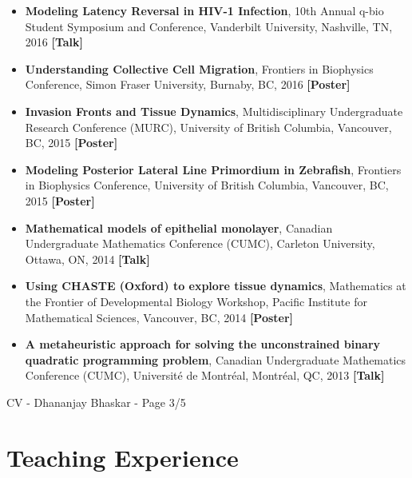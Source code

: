 \documentclass[margin,line]{res}
\begin{document}
\begin{resume}
{\renewcommand\leftmargini{0em}
\begin{itemize}
\item {\bf Modeling Latency Reversal in HIV-1 Infection}, 10th Annual q-bio Student Symposium and Conference, Vanderbilt University, Nashville, TN, 2016 {\bf[Talk]}
\vspace*{.2cm}
\item {\bf Understanding Collective Cell Migration}, Frontiers in Biophysics Conference, Simon Fraser University, Burnaby, BC, 2016 {\bf[Poster]}
\vspace*{.2cm}
\item {\bf Invasion Fronts and Tissue Dynamics}, Multidisciplinary Undergraduate Research Conference (MURC), University of British Columbia, Vancouver, BC, 2015 {\bf[Poster]}
\vspace*{.2cm}
\item {\bf Modeling Posterior Lateral Line Primordium in Zebrafish}, Frontiers in Biophysics Conference, University of British Columbia, Vancouver, BC, 2015 {\bf[Poster]}
\vspace*{.2cm}
\item {\bf Mathematical models of epithelial monolayer}, Canadian Undergraduate Mathematics Conference (CUMC), Carleton University, Ottawa, ON, 2014 {\bf[Talk]}
\vspace*{.2cm}
\item {\bf Using CHASTE (Oxford) to explore tissue dynamics}, Mathematics at the Frontier of Developmental Biology Workshop, Pacific Institute for Mathematical Sciences, Vancouver, BC, 2014 {\bf[Poster]}
\vspace*{.1cm}
\item {\bf A metaheuristic approach for solving the unconstrained binary quadratic programming problem}, Canadian Undergraduate Mathematics Conference (CUMC), Universit\'e de Montr\'eal, Montr\'eal, QC, 2013 {\bf[Talk]}
\end{itemize}
}

\newpage
\begin{flushright}
CV - Dhananjay Bhaskar - Page 3/5
\end{flushright}
\vspace*{.2cm}

\section{\sc Teaching Experience}


\end{resume}
\end{document}
